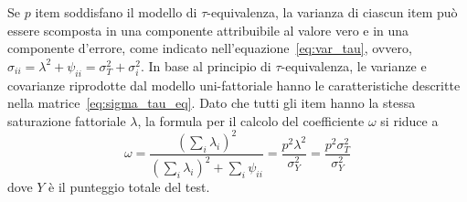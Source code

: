 Se $p$ item soddisfano il modello di $\tau$-equivalenza, la varianza di ciascun item può essere scomposta in una componente attribuibile al valore vero e in una componente d'errore, come indicato nell'equazione~\ref{eq:var_tau}, ovvero,  
$
\sigma_{ii} = \lambda^2 + \psi_{ii} =\sigma^2_T + \sigma^2_i
$. In base al principio di $\tau$-equivalenza, le varianze e covarianze riprodotte 
 dal modello uni-fattoriale hanno le caratteristiche descritte nella matrice~\ref{eq:sigma_tau_eq}. 
Dato che tutti gli item hanno la stessa saturazione fattoriale $\lambda$,  la formula per il calcolo del coefficiente $\omega$
si riduce a
\begin{equation}
\omega = \frac{\left( \sum_i \lambda_i \right)^2}{\left( \sum_i
    \lambda_i \right)^2  + \sum_i \psi_{ii}} = \frac{p^2 \lambda^2}{\sigma^2_Y} = \frac{p^2 \sigma_T^2}{\sigma_Y^2}
\end{equation}
dove $Y$ è il punteggio totale del test.

